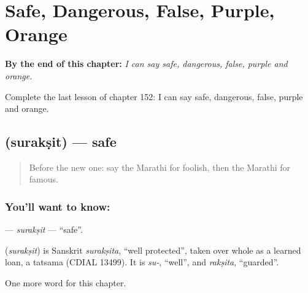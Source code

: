 
\chapter{Safe, Dangerous, False, Purple, Orange}
\label{ch:mr-safe-dangerous-false-purple-orange}

\begin{chapteropening}
\textbf{By the end of this chapter:} \emph{I can say safe, dangerous, false, purple and orange.}

Complete the last lesson of chapter 152: I can say safe, dangerous, false, purple and orange.
\end{chapteropening}

\section[\texorpdfstring{\mr{सुरक्षित} (surakṣit)}{सुरक्षित (surakṣit)}]{ (surakṣit) — safe}

\label{lesson:MR-C152-suraksit}



\begin{quote}
Before the new one: say the Marathi for foolish, then the Marathi for famous.
\end{quote}

\subsection*{You'll want to know: }
\textbf{} — \emph{surakṣit} — \textquotedblleft{}safe\textquotedblright{}.

\begin{cousinweb}
\textbf{} (\emph{surakṣit}) is Sanskrit \emph{surakṣita}, \textquotedblleft{}well protected\textquotedblright{}, taken over whole as a learned loan, a tatsama (CDIAL 13499). It is \emph{su-}, \textquotedblleft{}well\textquotedblright{}, and \emph{rakṣita}, \textquotedblleft{}guarded\textquotedblright{}.
\end{cousinweb}

\begin{grammarlens}[title={What you've built}]
One more word for this chapter.
\end{grammarlens}

